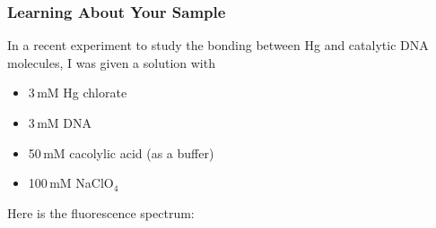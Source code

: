 \documentclass[10pt, xcolor=x11names, compress, handout]{beamer}
\begin{document}
\begin{frame}
  \frametitle{Learning About Your Sample}
  In a recent experiment to study the bonding between Hg and catalytic
  DNA molecules, I was given a solution with
  \begin{itemize}
  \item 3\,mM Hg chlorate
  \item 3\,mM DNA
  \item 50\,mM cacolylic acid (as a buffer)
  \item 100\,mM NaClO$_4$
  \end{itemize}
  Here is the fluorescence spectrum:\\[1ex]
  \begin{columns}
    \begin{column}{0.5\linewidth}
    \end{column}
    \begin{column}{0.5\linewidth}
      \begin{center}
      \end{center}

  \end{column}
\end{columns}


\end{frame}
\end{document}
